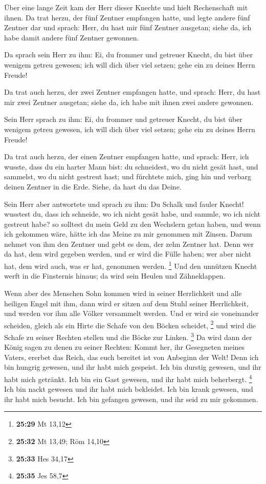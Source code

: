  Über eine lange Zeit kam der Herr dieser Knechte und hielt
Rechenschaft mit ihnen.  Da trat herzu, der fünf Zentner
empfangen hatte, und legte andere fünf Zentner dar und sprach: Herr, du
hast mir fünf Zentner ausgetan; siehe da, ich habe damit andere fünf
Zentner gewonnen.

 Da sprach sein Herr zu ihm: Ei, du frommer und getreuer
Knecht, du bist über wenigem getreu gewesen; ich will dich über viel
setzen; gehe ein zu deines Herrn Freude!

 Da trat auch herzu, der zwei Zentner empfangen hatte, und
sprach: Herr, du hast mir zwei Zentner ausgetan; siehe da, ich habe mit
ihnen zwei andere gewonnen.

 Sein Herr sprach zu ihm: Ei, du frommer und getreuer
Knecht, du bist über wenigem getreu gewesen, ich will dich über viel
setzen; gehe ein zu deines Herrn Freude!

 Da trat auch herzu, der einen Zentner empfangen hatte, und
sprach: Herr, ich wusste, dass du ein harter Mann bist: du schneidest,
wo du nicht gesät hast, und sammelst, wo du nicht gestreut hast;
 und fürchtete mich, ging hin und verbarg deinen Zentner in
die Erde. Siehe, da hast du das Deine.

 Sein Herr aber antwortete und sprach zu ihm: Du Schalk und
fauler Knecht! wusstest du, dass ich schneide, wo ich nicht gesät habe,
und sammle, wo ich nicht gestreut habe?  so solltest du
mein Geld zu den Wechslern getan haben, und wenn ich gekommen wäre,
hätte ich das Meine zu mir genommen mit Zinsen.  Darum
nehmet von ihm den Zentner und gebt es dem, der zehn Zentner hat.
 Denn wer da hat, dem wird gegeben werden, und er wird die
Fülle haben; wer aber nicht hat, dem wird auch, was er hat, genommen
werden. \footnote{\textbf{25:29} Mt 13,12}  Und den
unnützen Knecht werft in die Finsternis hinaus; da wird sein Heulen und
Zähneklappen.

 Wenn aber des Menschen Sohn kommen wird in seiner
Herrlichkeit und alle heiligen Engel mit ihm, dann wird er sitzen auf
dem Stuhl seiner Herrlichkeit,  und werden vor ihm alle
Völker versammelt werden. Und er wird sie voneinander scheiden, gleich
als ein Hirte die Schafe von den Böcken scheidet, \footnote{\textbf{25:32}
  Mt 13,49; Röm 14,10}  und wird die Schafe zu seiner
Rechten stellen und die Böcke zur Linken. \footnote{\textbf{25:33} Hes
  34,17}  Da wird dann der König sagen zu denen zu seiner
Rechten: Kommt her, ihr Gesegneten meines Vaters, ererbet das Reich, das
euch bereitet ist von Anbeginn der Welt!  Denn ich bin
hungrig gewesen, und ihr habt mich gespeist. Ich bin durstig gewesen,
und ihr habt mich getränkt. Ich bin ein Gast gewesen, und ihr habt mich
beherbergt. \footnote{\textbf{25:35} Jes 58,7}  Ich bin
nackt gewesen und ihr habt mich bekleidet. Ich bin krank gewesen, und
ihr habt mich besucht. Ich bin gefangen gewesen, und ihr seid zu mir
gekommen.

